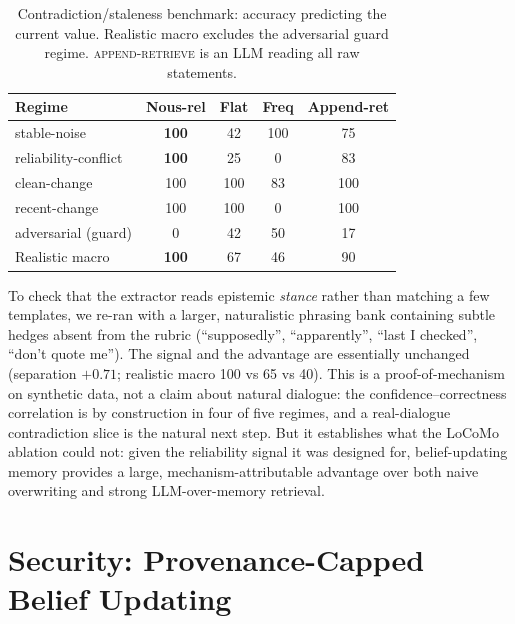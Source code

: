 \documentclass[11pt,a4paper,twocolumn]{article}
\begin{document}
\begin{table}[t]
\centering
\caption{Contradiction/staleness benchmark: accuracy predicting the current
value. Realistic macro excludes the adversarial guard regime.
\textsc{append-retrieve} is an LLM reading all raw statements.}
\label{tab:reliability}
\renewcommand{\arraystretch}{1.2}
\setlength{\tabcolsep}{4pt}
\small
\begin{tabular}{lcccc}
\toprule
Regime & Nous-rel & Flat & Freq & Append-ret \\
\midrule
stable-noise          & \textbf{100} & 42 & 100 & 75 \\
reliability-conflict  & \textbf{100} & 25 & 0   & 83 \\
clean-change          & 100 & 100 & 83 & 100 \\
recent-change         & 100 & 100 & 0  & 100 \\
adversarial (guard)   & 0   & 42 & 50 & 17 \\
\midrule
Realistic macro       & \textbf{100} & 67 & 46 & 90 \\
\bottomrule
\end{tabular}
\end{table}

To check that the extractor reads epistemic \emph{stance} rather than matching a
few templates, we re-ran with a larger, naturalistic phrasing bank containing
subtle hedges absent from the rubric (``supposedly'', ``apparently'', ``last I
checked'', ``don't quote me''). The signal and the advantage are essentially
unchanged (separation $+0.71$; realistic macro 100 vs 65 vs 40). This is a
proof-of-mechanism on synthetic data, not a claim about natural dialogue: the
confidence--correctness correlation is by construction in four of five regimes,
and a real-dialogue contradiction slice is the natural next step. But it
establishes what the LoCoMo ablation could not: given the reliability signal it
was designed for, belief-updating memory provides a large,
mechanism-attributable advantage over both naive overwriting and strong
LLM-over-memory retrieval.

\section{Security: Provenance-Capped Belief Updating}
\label{sec:security}
\end{document}
